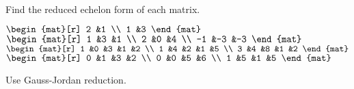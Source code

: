 \begin{exercises}
\begin{answer}
\begin{exparts}
\begin{multline*}
        \end{multline*}
       \end{exparts}  
     \end{answer}
  \recommended \item 
    Find the reduced echelon form of each matrix.
    \begin{exparts*}
      \partsitem \( \begin{mat}[r]
          2  &1  \\
          1  &3
        \end{mat}  \)
      \partsitem \( \begin{mat}[r]
          1  &3  &1  \\
          2  &0  &4  \\
         -1  &-3 &-3
        \end{mat}  \)
      \partsitem \( \begin{mat}[r]
          1  &0  &3  &1  &2  \\
          1  &4  &2  &1  &5  \\
          3  &4  &8  &1  &2
        \end{mat}  \)
      \partsitem \( \begin{mat}[r]
          0  &1  &3  &2  \\
          0  &0  &5  &6  \\
          1  &5  &1  &5
        \end{mat}  \)
    \end{exparts*}
    \begin{answer}
      Use Gauss-Jordan reduction.
\end{answer}
\end{exercises}

